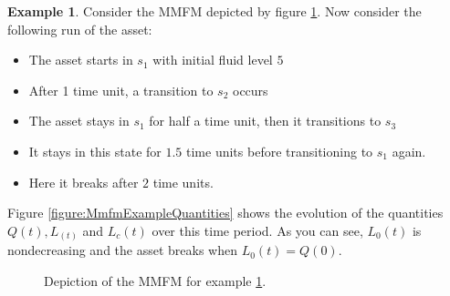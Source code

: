 \documentclass[a4paper]{thesis}
\theoremstyle{definition}
\newtheorem{example}{Example}[chapter]
\begin{document}
\begin{example}\label{example:MmfmState}
	Consider the MMFM depicted by figure \ref{figure:MmfmExample}.
	Now consider the following run of the asset:
	\begin{itemize}
		\item The asset starts in $s_1$ with initial fluid level $5$
		\item After 1 time unit, a transition to $s_2$ occurs
		\item The asset stays in $s_1$ for half a time unit, then it transitions to $s_3$
		\item It stays in this state for $1.5$ time units before transitioning to $s_1$ again.
		\item Here it breaks after $2$ time units.
	\end{itemize}
	Figure \ref{figure:MmfmExampleQuantities} shows the evolution of the quantities $Q(t),L_(t)$ and $L_c(t)$ over this time period.
	As you can see, $L_0(t)$ is nondecreasing and the asset breaks when $L_0(t)=Q(0)$.
\end{example}
\begin{figure}
\centering
{}
\caption{Depiction of the MMFM for example \ref{example:MmfmState}.}
\label{figure:MmfmExample}
\end{figure}
\end{document}

